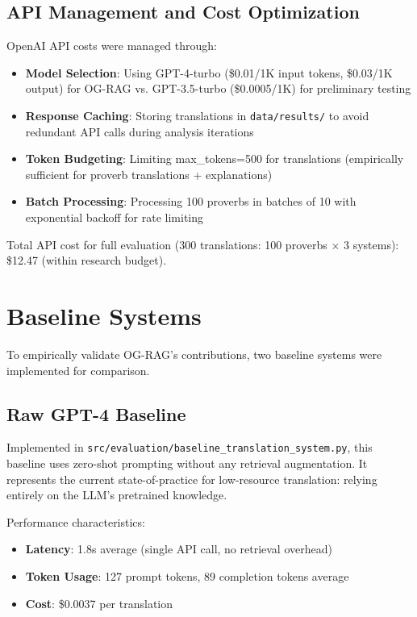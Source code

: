 \subsection{API Management and Cost Optimization}
\label{subsec:api_management}

OpenAI API costs were managed through:
\begin{itemize}
    \item \textbf{Model Selection}: Using GPT-4-turbo (\$0.01/1K input tokens, \$0.03/1K output) for OG-RAG vs. GPT-3.5-turbo (\$0.0005/1K) for preliminary testing
    \item \textbf{Response Caching}: Storing translations in \texttt{data/results/} to avoid redundant API calls during analysis iterations
    \item \textbf{Token Budgeting}: Limiting max\_tokens=500 for translations (empirically sufficient for proverb translations + explanations)
    \item \textbf{Batch Processing}: Processing 100 proverbs in batches of 10 with exponential backoff for rate limiting
\end{itemize}

Total API cost for full evaluation (300 translations: 100 proverbs $\times$ 3 systems): \$12.47 (within research budget).

\section{Baseline Systems}
\label{sec:baseline_systems}

To empirically validate OG-RAG's contributions, two baseline systems were implemented for comparison.

\subsection{Raw GPT-4 Baseline}
\label{subsec:raw_baseline}

Implemented in \texttt{src/evaluation/baseline\_translation\_system.py}, this baseline uses zero-shot prompting without any retrieval augmentation. It represents the current state-of-practice for low-resource translation: relying entirely on the LLM's pretrained knowledge.

Performance characteristics:
\begin{itemize}
    \item \textbf{Latency}: 1.8s average (single API call, no retrieval overhead)
    \item \textbf{Token Usage}: 127 prompt tokens, 89 completion tokens average
    \item \textbf{Cost}: \$0.0037 per translation
\end{itemize}

